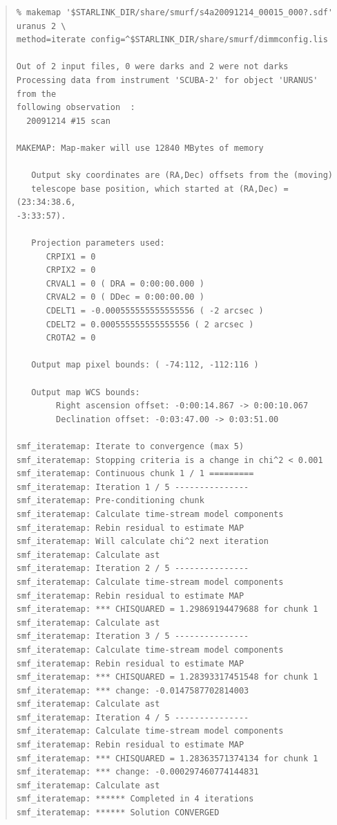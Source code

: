 \documentclass[twoside,11pt]{article}
\renewcommand{\_}{\texttt{\symbol{95}}}
\newenvironment{myquote}{\begin{quote}\begin{small}}{\end{small}\end{quote}}
\begin{document}
\begin{myquote}
\begin{verbatim}
% makemap '$STARLINK_DIR/share/smurf/s4a20091214_00015_000?.sdf' uranus 2 \
method=iterate config=^$STARLINK_DIR/share/smurf/dimmconfig.lis

Out of 2 input files, 0 were darks and 2 were not darks
Processing data from instrument 'SCUBA-2' for object 'URANUS' from the
following observation  :
  20091214 #15 scan

MAKEMAP: Map-maker will use 12840 MBytes of memory

   Output sky coordinates are (RA,Dec) offsets from the (moving)
   telescope base position, which started at (RA,Dec) = (23:34:38.6,
-3:33:57).

   Projection parameters used:
      CRPIX1 = 0
      CRPIX2 = 0
      CRVAL1 = 0 ( DRA = 0:00:00.000 )
      CRVAL2 = 0 ( DDec = 0:00:00.00 )
      CDELT1 = -0.000555555555555556 ( -2 arcsec )
      CDELT2 = 0.000555555555555556 ( 2 arcsec )
      CROTA2 = 0

   Output map pixel bounds: ( -74:112, -112:116 )

   Output map WCS bounds:
        Right ascension offset: -0:00:14.867 -> 0:00:10.067
        Declination offset: -0:03:47.00 -> 0:03:51.00

smf_iteratemap: Iterate to convergence (max 5)
smf_iteratemap: Stopping criteria is a change in chi^2 < 0.001
smf_iteratemap: Continuous chunk 1 / 1 =========
smf_iteratemap: Iteration 1 / 5 ---------------
smf_iteratemap: Pre-conditioning chunk
smf_iteratemap: Calculate time-stream model components
smf_iteratemap: Rebin residual to estimate MAP
smf_iteratemap: Will calculate chi^2 next iteration
smf_iteratemap: Calculate ast
smf_iteratemap: Iteration 2 / 5 ---------------
smf_iteratemap: Calculate time-stream model components
smf_iteratemap: Rebin residual to estimate MAP
smf_iteratemap: *** CHISQUARED = 1.29869194479688 for chunk 1
smf_iteratemap: Calculate ast
smf_iteratemap: Iteration 3 / 5 ---------------
smf_iteratemap: Calculate time-stream model components
smf_iteratemap: Rebin residual to estimate MAP
smf_iteratemap: *** CHISQUARED = 1.28393317451548 for chunk 1
smf_iteratemap: *** change: -0.0147587702814003
smf_iteratemap: Calculate ast
smf_iteratemap: Iteration 4 / 5 ---------------
smf_iteratemap: Calculate time-stream model components
smf_iteratemap: Rebin residual to estimate MAP
smf_iteratemap: *** CHISQUARED = 1.28363571374134 for chunk 1
smf_iteratemap: *** change: -0.000297460774144831
smf_iteratemap: Calculate ast
smf_iteratemap: ****** Completed in 4 iterations
smf_iteratemap: ****** Solution CONVERGED
\end{verbatim}
\end{myquote}
\end{document}
